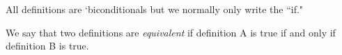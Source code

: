 \documentclass{../ximera}
\begin{document}
All definitions are `biconditionals but we normally only write the ``if."

We say that two definitions are \emph{equivalent} if definition A is true if and only if definition B is true. 
%
\end{document}
